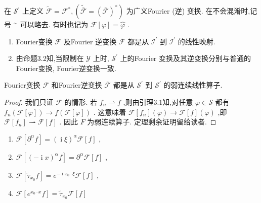 \documentclass[lang=cn,newtx,10pt,scheme=chinese,thmcnt=chapter]{elegantbook}
\newcommand{\ci}{\operatorname{i}}
\begin{document}
\begin{definition}
  在 \({\mathcal{S}}^{\prime }\) 上定义 \(\widetilde{\mathcal{F}} = {\mathcal{F}}^{ * },\left( {\widetilde{\overline{\mathcal{F}}} = {\left( \overline{\mathcal{F}}\right) }^{ * }}\right)\) 为广义Fourier (逆) 变换. 在不会混淆时,记号 \({}^{ \sim  }\) 可以略去. 有时也记为 \(\mathcal{F}\left\lbrack  \varphi \right\rbrack   = \widehat{\varphi }\) .

\end{definition}
\begin{note}
  \begin{enumerate}
    \item Fourier变换 \(\mathcal{F}\) 及Fourier 逆变换 \(\overline{\mathcal{F}}\) 都是从 \({\mathcal{I}}^{\prime }\) 到 \({\mathcal{I}}^{\prime }\) 的线性映射.
    \item 由命题3.2知,当限制在 \(\mathcal{Y}\) 上时, \({\mathcal{S}}^{\prime }\) 上的Fourier 变换及其逆变换分别与普通的Fourier变换, Fourier逆变换一致.

  \end{enumerate}
\end{note}
\begin{proposition}
  Fourier变换 \(\mathcal{F}\) 和Fourier逆变换 \(\overline{\mathcal{F}}\) 都是从 \({\mathcal{S}}^{\prime }\) 到 \({\mathcal{S}}^{\prime }\) 的弱连续线性算子.
\end{proposition}
\begin{proof}
  我们只证 \(\mathcal{F}\) 的情形. 若 \({f}_{n} \rightharpoonup  f\) ,则由引理3.1知,对任意 \(\varphi  \in  \mathcal{S}\) 都有 \({f}_{n}\left( {\mathcal{F}\left\lbrack  \varphi \right\rbrack  }\right)  \rightarrow  f\left( {\mathcal{F}\left\lbrack  \varphi \right\rbrack  }\right)\) . 这意味着 \(\mathcal{F}\left\lbrack  {f}_{n}\right\rbrack  \left( \varphi \right)  \rightarrow  \mathcal{F}\left\lbrack  f\right\rbrack  \left( \varphi \right)\) ,即 \(\mathcal{F}\left\lbrack  {f}_{n}\right\rbrack   \rightharpoonup  \mathcal{F}\left\lbrack  f\right\rbrack\) . 因此 \(F\) 为弱连续算子. 定理剩余证明留给读者.

\end{proof}
\begin{theorem}
  \begin{enumerate}
    \item  \(\mathcal{F}\left\lbrack  {{\partial }^{\alpha }f}\right\rbrack   = {\left( \ci\xi \right) }^{\alpha }\mathcal{F}\left\lbrack  f\right\rbrack\) ,
    \item \(\mathcal{F}\left\lbrack  {{\left( -\ci x\right) }^{\alpha }f}\right\rbrack   = {\partial }^{\alpha }\mathcal{F}\left\lbrack  f\right\rbrack\) ,
    \item \(\mathcal{F}\left\lbrack  {{\widetilde{\tau }}_{{x}_{0}}f}\right\rbrack   = {e}^{-\ci{x}_{0} \cdot  \xi }\mathcal{F}\left\lbrack  f\right\rbrack\) ,
    \item  \(\mathcal{F}\left\lbrack  {{e}^{{x}_{0} \cdot  x}f}\right\rbrack   = {\widetilde{\tau }}_{{x}_{0}}\mathcal{F}\left\lbrack  f\right\rbrack\)

  \end{enumerate}
\end{theorem}
\end{document}
